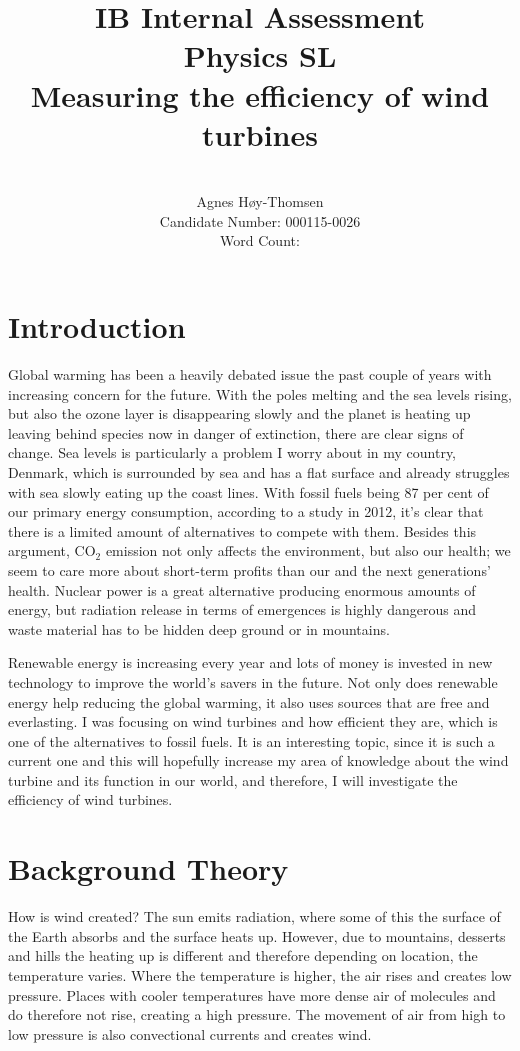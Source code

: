 \documentclass[12pt]{article}
\title{\textbf{IB Internal Assessment}\\\textbf{Physics SL}\\ \vspace{5cm}Measuring the efficiency of wind turbines}
\author{\vspace{5cm}\\Agnes H\o y-Thomsen\\Candidate Number: 000115-0026\\Word Count: }
\begin{document}
\maketitle
\clearpage
\vspace{5cm}
\tableofcontents
\newpage

\section{Introduction} 

Global warming has been a heavily debated issue the past couple of years with increasing concern for the future. With the poles melting and the sea levels rising, but also the ozone layer is disappearing slowly and the planet is heating up leaving behind species now in danger of extinction, there are clear signs of change. Sea levels is particularly a problem I worry about in my country, Denmark, which is surrounded by sea and has a flat surface and already struggles with sea slowly eating up the coast lines. With fossil fuels being 87 per cent of our primary energy consumption, according to a study in 2012, it’s clear that there is a limited amount of alternatives to compete with them. Besides this argument, CO$_2$ emission not only affects the environment, but also our health; we seem to care more about short-term profits than our and the next generations’ health. Nuclear power is a great alternative producing enormous amounts of energy, but radiation release in terms of emergences is highly dangerous and waste material has to be hidden deep ground or in mountains.

Renewable energy is increasing every year and lots of money is invested in new technology to improve the world’s savers in the future. Not only does renewable energy help reducing the global warming, it also uses sources that are free and everlasting. I was focusing on wind turbines and how efficient they are, which is one of the alternatives to fossil fuels. It is an interesting topic, since it is such a current one and this will hopefully increase my area of knowledge about the wind turbine and its function in our world, and therefore, I will investigate the efficiency of wind turbines.


\section{Background Theory}
How is wind created?
The sun emits radiation, where some of this the surface of the Earth absorbs and the surface heats up. However, due to mountains, desserts and hills the heating up is different and therefore depending on location, the temperature varies. Where the temperature is higher, the air rises and creates low pressure. Places with cooler temperatures have more dense air of molecules and do therefore not rise, creating a high pressure. The movement of air from high to low pressure is also convectional currents and creates wind.
\end{document}
